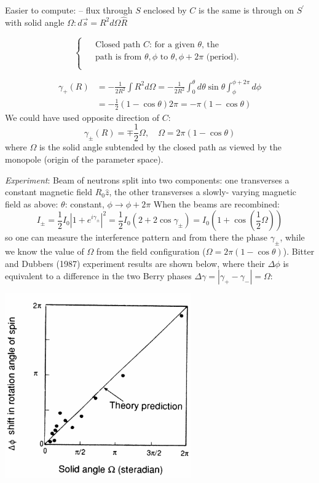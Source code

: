 \documentclass[12pt]{article}
\newcommand{\be}{\begin{equation}}
\newcommand{\ee}{\end{equation}}
\begin{document}
\begin{minipage}{0.4\textwidth}
Easier to compute:
-- flux through $S$
enclosed by $C$ is the
same is through on $S^{\prime}$
with solid angle $\Omega: d \vec{s}=R^{2} d \Omega \hat{R}$
\end{minipage}%
\hfill
\begin{minipage}{0.6\textwidth}
\[
\begin{cases}
\begin{aligned}
&\text{Closed path $C$: for a given $\theta$, the}\\
&\text{path is from $\theta, \phi$ to $\theta, \phi+2 \pi$ (period).}\\
\end{aligned}
\end{cases}
\]
\vspace{1em}
\end{minipage}

\be
\begin{aligned}
\gamma_{+}(R)
&=-\frac{1}{2 R^{2}} \int R^{2} d \Omega=-\frac{1}{2 R^{2}} \int_{0}^{\theta} d \theta \sin \theta \int_{\phi}^{\phi+2 \pi} d \phi\\
&=-\frac{1}{2}(1-\cos \theta) 2 \pi=-\pi(1-\cos \theta)
\end{aligned}
\ee
We could have used opposite direction of $C$:
\[
\gamma_{\pm}(R)=\mp \frac{1}{2} \Omega, \quad \Omega=2 \pi(1-\cos \theta)
\]
where $\Omega$ is the
solid angle subtended by the
closed path as viewed by
the monopole (origin of the
parameter space).

\emph{Experiment}: Beam of neutrons
split into two
components: 
one transverses a constant
magnetic field $R_{0} \hat{z}$,
the other transverses a slowly-%
varying magnetic field as above:
$\theta$: constant, $\phi \rightarrow \phi+2 \pi$
When the beams are recombined:
\be
I_{\pm} 
=\frac{1}{2} I_{0}\left|1+e^{i \gamma_{\pm}}\right|^{2}=\frac{1}{2} I_{0}\left(2+2 \cos \gamma_{\pm}\right)
=I_{0}\left(1+\cos \left(\frac{1}{2}\Omega\right)\right) 
\ee
so one can measure the interference pattern and from there the phase $\gamma_\pm$,
while we know the value of $\Omega$ from the field configuration ($\Omega = 2\pi(1-\cos\theta)$).
Bitter and Dubbers (1987) experiment results are shown below,
where their $\Delta\phi$ is equivalent to a difference in the two Berry phases $\Delta\gamma = |\gamma_+-\gamma_-| = \Omega$:
\begin{center}
\includegraphics[width=0.6\textwidth]{Figures/BerryPhase.pdf}
\end{center}
\end{document}
